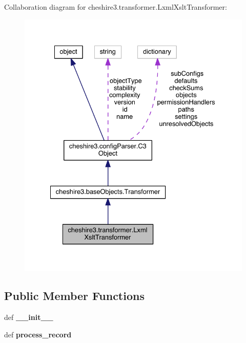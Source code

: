 Collaboration diagram for cheshire3.\-transformer.\-Lxml\-Xslt\-Transformer\-:
\nopagebreak
\begin{figure}[H]
\begin{center}
\leavevmode
\includegraphics[width=331pt]{classcheshire3_1_1transformer_1_1_lxml_xslt_transformer__coll__graph}
\end{center}
\end{figure}
\subsection*{Public Member Functions}
\begin{DoxyCompactItemize}
\item 
\hypertarget{classcheshire3_1_1transformer_1_1_lxml_xslt_transformer_a906887e3893749b2e4b5477ddbc88d5f}{def {\bfseries \-\_\-\-\_\-init\-\_\-\-\_\-}}\label{classcheshire3_1_1transformer_1_1_lxml_xslt_transformer_a906887e3893749b2e4b5477ddbc88d5f}

\item 
\hypertarget{classcheshire3_1_1transformer_1_1_lxml_xslt_transformer_a981b3608872dc0caba7713827c8c96aa}{def {\bfseries process\-\_\-record}}\label{classcheshire3_1_1transformer_1_1_lxml_xslt_transformer_a981b3608872dc0caba7713827c8c96aa}

\end{DoxyCompactItemize}
